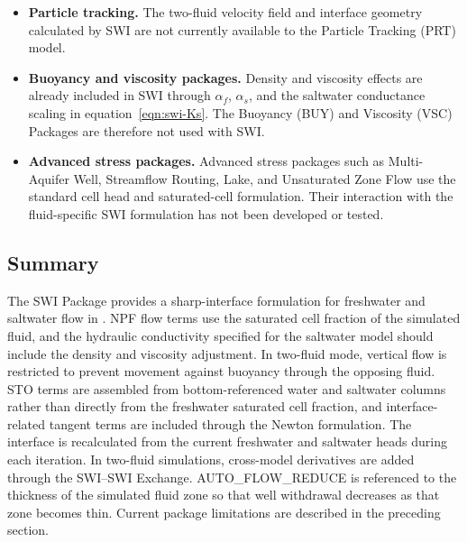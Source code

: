 \begin{itemize}
\item \textbf{Particle tracking.} The two-fluid velocity field and interface geometry calculated by SWI are not currently available to the Particle Tracking (PRT) model.

\item \textbf{Buoyancy and viscosity packages.} Density and viscosity effects are already included in SWI through $\alpha_{f}$, $\alpha_{s}$, and the saltwater conductance scaling in equation~\ref{eqn:swi-Ks}. The Buoyancy (BUY) and Viscosity (VSC) Packages are therefore not used with SWI.

\item \textbf{Advanced stress packages.} Advanced stress packages such as Multi-Aquifer Well, Streamflow Routing, Lake, and Unsaturated Zone Flow use the standard cell head and saturated-cell formulation. Their interaction with the fluid-specific SWI formulation has not been developed or tested.

\end{itemize}

\subsection{Summary}

The SWI Package provides a sharp-interface formulation for freshwater and saltwater flow in \mf. NPF flow terms use the saturated cell fraction of the simulated fluid, and the hydraulic conductivity specified for the saltwater model should include the density and viscosity adjustment. In two-fluid mode, vertical flow is restricted to prevent movement against buoyancy through the opposing fluid. STO terms are assembled from bottom-referenced water and saltwater columns rather than directly from the freshwater saturated cell fraction, and interface-related tangent terms are included through the Newton formulation. The interface is recalculated from the current freshwater and saltwater heads during each iteration. In two-fluid simulations, cross-model derivatives are added through the SWI--SWI Exchange. AUTO\_FLOW\_REDUCE is referenced to the thickness of the simulated fluid zone so that well withdrawal decreases as that zone becomes thin. Current package limitations are described in the preceding section.
